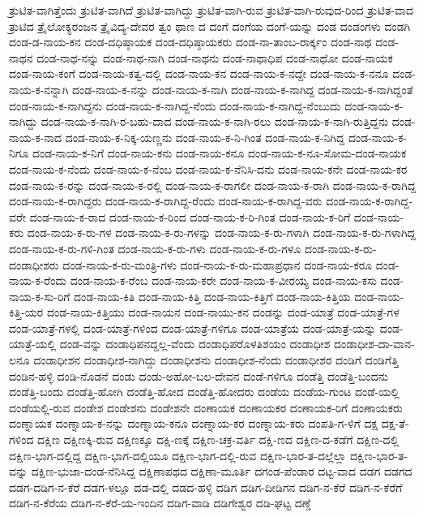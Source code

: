 {ತ್ರುಟಿತ-ವಾಗಿತ್ತೆಂದು
ತ್ರುಟಿತ-ವಾಗಿದೆ
ತ್ರುಟಿತ-ವಾಗಿದ್ದು
ತ್ರುಟಿತ-ವಾಗಿ-ರುವ
ತ್ರುಟಿತ-ವಾಗಿ-ರುವುದ-ರಿಂದ
ತ್ರುಟಿತ-ವಾದ
ತ್ರುಟಿದ
ತ್ರೈಲೋಕ್ಯರಂಜನ
ತ್ರೈವಿದ್ಯ-ದೇವರ
ತ್ವಂ
ಥಾಣ
ದ
ದಂಗೆ
ದಂಗೆಯ
ದಂಗೆ-ಯನ್ನು
ದಂಡ
ದಂಡಂಗಳು
ದಂಡಗಿ
ದಂಡ-ಡ-ನಾಯ-ಕನ
ದಂಡ-ದಧಿಷ್ಠಾಯಕ
ದಂಡ-ದಧಿಷ್ಠಾಯಕರು
ದಂಡ-ನಾ-ತಾಂಬ-ರಾರ್ಕ್ಕಂ
ದಂಡ-ನಾಥ
ದಂಡ-ನಾಥನ
ದಂಡ-ನಾಥ-ನನ್ನು
ದಂಡ-ನಾಥ-ನಾಗಿ
ದಂಡ-ನಾಥನು
ದಂಡ-ನಾಥಾಧಿಪ
ದಂಡ-ನಾಥೋ
ದಂಡ-ನಾಯಕ
ದಂಡ-ನಾಯ-ಕಂಗೆ
ದಂಡ-ನಾಯ-ಕತ್ವ-ದಲ್ಲಿ
ದಂಡ-ನಾಯ-ಕನ
ದಂಡ-ನಾಯ-ಕ-ನದ್ದೇ
ದಂಡ-ನಾಯ-ಕ-ನನೂ
ದಂಡ-ನಾಯ-ಕ-ನನ್ನಾಗಿ
ದಂಡ-ನಾಯ-ಕ-ನನ್ನು
ದಂಡ-ನಾಯ-ಕ-ನಾಗಿ
ದಂಡ-ನಾಯ-ಕ-ನಾಗಿದ್ದ
ದಂಡ-ನಾಯ-ಕ-ನಾಗಿದ್ದಂತೆ
ದಂಡ-ನಾಯ-ಕ-ನಾಗಿದ್ದನು
ದಂಡ-ನಾಯ-ಕ-ನಾಗಿದ್ದ-ನೆಂದು
ದಂಡ-ನಾಯ-ಕ-ನಾಗಿದ್ದ-ನೆಂಬುದು
ದಂಡ-ನಾಯ-ಕ-ನಾಗಿದ್ದು
ದಂಡ-ನಾಯ-ಕ-ನಾಗಿ-ರ-ಬಹು-ದಾದ
ದಂಡ-ನಾಯ-ಕ-ನಾಗಿ-ರಲು
ದಂಡ-ನಾಯ-ಕ-ನಾಗಿ-ರುತ್ತಿದ್ದನು
ದಂಡ-ನಾಯ-ಕ-ನಾದ
ದಂಡ-ನಾಯ-ಕ-ನಿಕ್ಕ-ಯಣ್ಣನು
ದಂಡ-ನಾಯ-ಕ-ನಿ-ಗಿಂತ
ದಂಡ-ನಾಯ-ಕ-ನಿಗಿದ್ದ
ದಂಡ-ನಾಯ-ಕ-ನಿಗೂ
ದಂಡ-ನಾಯ-ಕ-ನಿಗೆ
ದಂಡ-ನಾಯ-ಕನು
ದಂಡ-ನಾಯ-ಕನೂ
ದಂಡ-ನಾಯ-ಕ-ನೂ-ಸೋಮ-ದಂಡ-ನಾಯಕ
ದಂಡ-ನಾಯ-ಕ-ನೆಂದು
ದಂಡ-ನಾಯ-ಕ-ನೆಂಬ
ದಂಡ-ನಾಯ-ಕ-ನೆನಿಸಿ-ದನು
ದಂಡ-ನಾಯ-ಕನೇ
ದಂಡ-ನಾಯ-ಕರ
ದಂಡ-ನಾಯ-ಕ-ರನ್ನು
ದಂಡ-ನಾಯ-ಕ-ರಲ್ಲಿ
ದಂಡ-ನಾಯ-ಕ-ರಾಗಲೀ
ದಂಡ-ನಾಯ-ಕ-ರಾಗಿ
ದಂಡ-ನಾಯ-ಕ-ರಾಗಿದ್ದ
ದಂಡ-ನಾಯ-ಕ-ರಾಗಿದ್ದರು
ದಂಡ-ನಾಯ-ಕ-ರಾಗಿದ್ದ-ರೆಂದು
ದಂಡ-ನಾಯ-ಕ-ರಾಗಿದ್ದ-ವರು
ದಂಡ-ನಾಯ-ಕ-ರಾಗಿದ್ದ-ವರೇ
ದಂಡ-ನಾಯ-ಕ-ರಾದ
ದಂಡ-ನಾಯ-ಕ-ರಿಂದ
ದಂಡ-ನಾಯ-ಕ-ರಿ-ಗಿಂತ
ದಂಡ-ನಾಯ-ಕ-ರಿಗೆ
ದಂಡ-ನಾಯ-ಕರು
ದಂಡ-ನಾಯ-ಕ-ರು-ಗಳ
ದಂಡ-ನಾಯ-ಕ-ರು-ಗಳನ್ನು
ದಂಡ-ನಾಯ-ಕ-ರು-ಗಳಾಗಿ
ದಂಡ-ನಾಯ-ಕ-ರು-ಗಳಾಗಿದ್ದ
ದಂಡ-ನಾಯ-ಕ-ರು-ಗಳಿ-ಗಿಂತ
ದಂಡ-ನಾಯ-ಕ-ರು-ಗಳು
ದಂಡ-ನಾಯ-ಕ-ರು-ಗಳೂ
ದಂಡ-ನಾಯ-ಕ-ರು-ದಂಡಾಧೀಶರು
ದಂಡ-ನಾಯ-ಕ-ರು-ಮಂತ್ರಿ-ಗಳು
ದಂಡ-ನಾಯ-ಕ-ರು-ಮಹಾಪ್ರಧಾನ
ದಂಡ-ನಾಯ-ಕರೂ
ದಂಡ-ನಾಯ-ಕ-ರೆಂದು
ದಂಡ-ನಾಯ-ಕ-ರೆಂಬ
ದಂಡ-ನಾಯ-ಕರೇ
ದಂಡ-ನಾಯ-ಕ-ವೀರಯ್ಯ
ದಂಡ-ನಾಯ-ಕಸು
ದಂಡ-ನಾಯ-ಕ-ಸು-ರಿಗೆ
ದಂಡ-ನಾಯ-ಕಿತಿ
ದಂಡ-ನಾಯ-ಕಿತ್ತಿ
ದಂಡ-ನಾಯ-ಕಿತ್ತಿಗೆ
ದಂಡ-ನಾಯ-ಕಿತ್ತಿಯ
ದಂಡ-ನಾಯ-ಕಿತ್ತಿ-ಯರ
ದಂಡ-ನಾಯ-ಕಿತ್ತಿಯು
ದಂಡ-ನಾಯನ
ದಂಡ-ನಾಯು-ಕನ
ದಂಡನ್ನು
ದಂಡ-ಯಾತ್ರೆ
ದಂಡ-ಯಾತ್ರೆ-ಗಳ
ದಂಡ-ಯಾತ್ರೆ-ಗಳಲ್ಲಿ
ದಂಡ-ಯಾತ್ರೆ-ಗಳಿಂದ
ದಂಡ-ಯಾತ್ರೆ-ಗಳಿಗೂ
ದಂಡ-ಯಾತ್ರೆಯ
ದಂಡ-ಯಾತ್ರೆ-ಯನ್ನು
ದಂಡ-ಯಾತ್ರೆ-ಯಲ್ಲಿ
ದಂಡ-ವನ್ನು
ದಂಡಾಧಿಪನದ್ದಲ್ಲ-ವೆಂದು
ದಂಡಾಧಿಪರೊಳತಿಶಯಂ
ದಂಡಾಧೀಶ
ದಂಡಾಧೀಶ-ದಾ-ವಾನ-ಲನೂ
ದಂಡಾಧೀಶನ
ದಂಡಾಧೀಶ-ನಾಗಿದ್ದು
ದಂಡಾಧೀಶನು
ದಂಡಾಧೀಶ-ನೆಂದು
ದಂಡಾಧೀಶರ
ದಂಡಿಗೆ
ದಂಡಿಗೆತ್ತಿ
ದಂಡಿನ-ಹಳ್ಳಿ
ದಂಡಿ-ನೊಡನೆ
ದಂಡು
ದಂಡು-ಅಹೋ-ಬಲ-ದೇವನ
ದಂಡೆ-ಗಳಿಗೂ
ದಂಡೆತ್ತಿ
ದಂಡೆತ್ತಿ-ಬಂದನು
ದಂಡೆತ್ತಿ-ಬಂದು
ದಂಡೆತ್ತಿ-ಹೋಗಿ
ದಂಡೆತ್ತಿ-ಹೋದ
ದಂಡೆತ್ತಿ-ಹೋದರು
ದಂಡೆಯ
ದಂಡೆಯ-ಗುಂಟ
ದಂಡೆ-ಯಲ್ಲಿ
ದಂಡೆಯಲ್ಲಿ-ರುವ
ದಂಡೇಶ
ದಂಡೇಶನು
ದಂಡೇಶನೇ
ದಂಣಾಯಕ
ದಂಣಾಯಕರ
ದಂಣಾಯಕ-ರಿಗೆ
ದಂಣಾಯಕರು
ದಂಣ್ನಾಯಕ
ದಂಣ್ನಾಯ-ಕ-ನನ್ನು
ದಂಣ್ನಾಯ-ಕನೂ
ದಂಣ್ನಾಯ-ಕರ
ದಂಣ್ನಾಯ-ಕರು
ದಂಪತಿ-ಗ-ಳಿಗೆ
ದಕ್ಷ
ದಕ್ಷ-ತೆ-ಗಳಿಂದ
ದಕ್ಷಿಣ
ದಕ್ಷಿಣಕ್ಕಿ-ರುವ
ದಕ್ಷಿಣಕ್ಕೂ
ದಕ್ಷಿ-ಣಕ್ಕೆ
ದಕ್ಷಿಣ-ಚಕ್ರ-ವರ್ತಿ
ದಕ್ಷಿ-ಣದ
ದಕ್ಷಿಣ-ದ-ಕಡೆಗೆ
ದಕ್ಷಿಣ-ದಲ್ಲಿ
ದಕ್ಷಿಣ-ಭಾಗ-ದಲ್ಲಿದ್ದ
ದಕ್ಷಿಣ-ಭಾಗ-ದಲ್ಲಿಯೂ
ದಕ್ಷಿಣ-ಭಾಗ-ದಲ್ಲಿ-ರುವ
ದಕ್ಷಿಣ-ಭಾರ-ತ-ದಲ್ಲೆಲ್ಲಾ
ದಕ್ಷಿಣ-ಭಾರ-ತ-ವನ್ನು
ದಕ್ಷಿಣ-ಭುಜಾ-ದಂಡ-ನೆನಿಸಿದ್ದ
ದಕ್ಷಿಣಾಪಥದ
ದಕ್ಷಿಣಾ-ಮೂರ್ತಿ
ದಗಂಡ-ಪೆಂಡಾರ
ದಟ್ಟ-ವಾದ
ದಡಗ
ದಡಗದ
ದಡಗ-ದಡಿಗ-ನ-ಕೆರೆ
ದಡಗ-ಳಲ್ಲೂ
ದಡ-ದಲ್ಲಿ
ದಡದ-ಹಳ್ಳಿ
ದಡಿಗ
ದಡಿಗ-ದೀಡಿಗನ
ದಡಿಗ-ನ-ಕೆರೆ
ದಡಿಗ-ನ-ಕೆರೆಗೆ
ದಡಿಗ-ನ-ಕೆರೆಯ
ದಡಿಗ-ನ-ಕೆರೆ-ಯ-ಇಂದಿನ
ದಡಿಗ-ವಾಡಿ
ದಡಿಗೇಶ್ವರ
ದಡಿ-ಘಟ್ಟ
ದಣ್ಡೆ
}
